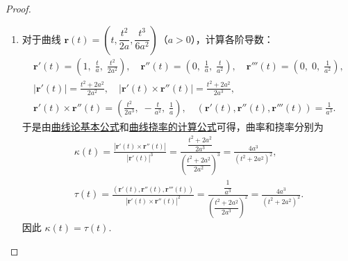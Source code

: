 \documentclass[../../main.tex]{subfiles}%
\begin{document}
\begin{proof}
\begin{enumerate}[(1)]
\item 对于曲线 $\bm{r}(t) = \left(t, \dfrac{t^2}{2a}, \dfrac{t^3}{6a^2}\right)$（$a>0$），计算各阶导数：
\begin{gather*}
\boldsymbol{r}'(t)=\left(1,\;\frac{t}{a},\;\frac{t^2}{2a^2}\right),\quad
\boldsymbol{r}''(t)=\left(0,\;\frac{1}{a},\;\frac{t}{a^2}\right),\quad
\boldsymbol{r}'''(t)=\left(0,\;0,\;\frac{1}{a^2}\right),\\
\left|\boldsymbol{r}'(t)\right|=\frac{t^2+2a^2}{2a^2},\quad
\left|\boldsymbol{r}'(t)\times\boldsymbol{r}''(t)\right|=\frac{t^2+2a^2}{2a^3},\\
\boldsymbol{r}'(t)\times\boldsymbol{r}''(t)=\left(\frac{t^2}{2a^3},\;-\frac{t}{a^2},\;\frac{1}{a}\right),\quad
(\boldsymbol{r}'(t),\boldsymbol{r}''(t),\boldsymbol{r}'''(t))=\frac{1}{a^3}.
\end{gather*}
于是由\hyperref[theorem:曲线论基本公式]{曲线论基本公式}和\hyperref[theorem:微分几何-曲线挠率的计算公式]{曲线挠率的计算公式}可得，曲率和挠率分别为
\begin{gather*}
\kappa(t)=\frac{\left|\boldsymbol{r}'(t)\times\boldsymbol{r}''(t)\right|}{\left|\boldsymbol{r}'(t)\right|^3}
= \frac{\dfrac{t^2+2a^2}{2a^3}}{\left(\dfrac{t^2+2a^2}{2a^2}\right)^3}
= \frac{4a^3}{(t^2+2a^2)^2},\\
\tau(t)=\frac{(\boldsymbol{r}'(t),\boldsymbol{r}''(t),\boldsymbol{r}'''(t))}{\left|\boldsymbol{r}'(t)\times\boldsymbol{r}''(t)\right|^2}
= \frac{\dfrac{1}{a^3}}{\left(\dfrac{t^2+2a^2}{2a^3}\right)^2}
= \frac{4a^3}{(t^2+2a^2)^2}.
\end{gather*}
因此 $\kappa(t)=\tau(t)$.


\end{enumerate}
\end{proof}
\end{document}
